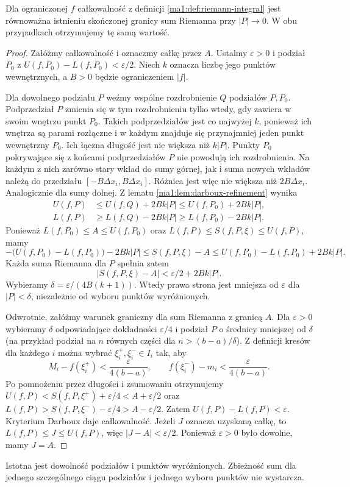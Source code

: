 \begin{twierdzenie}
\label{ma1:thm:riemann-darboux-equivalence}
Dla ograniczonej $f$ całkowalność z definicji \ref{ma1:def:riemann-integral} jest równoważna istnieniu skończonej granicy sum Riemanna przy $|P|\to0$. W obu przypadkach otrzymujemy tę samą wartość.
\end{twierdzenie}
\begin{proof}
Załóżmy całkowalność i oznaczmy całkę przez $A$. Ustalmy $\varepsilon>0$ i podział $P_0$ z $U(f,P_0)-L(f,P_0)<\varepsilon/2$. Niech $k$ oznacza liczbę jego punktów wewnętrznych, a $B>0$ będzie ograniczeniem $|f|$.

Dla dowolnego podziału $P$ weźmy wspólne rozdrobnienie $Q$ podziałów $P,P_0$. Podprzedział $P$ zmienia się w tym rozdrobnieniu tylko wtedy, gdy zawiera w swoim wnętrzu punkt $P_0$. Takich podprzedziałów jest co najwyżej $k$, ponieważ ich wnętrza są parami rozłączne i w każdym znajduje się przynajmniej jeden punkt wewnętrzny $P_0$. Ich łączna długość jest nie większa niż $k|P|$. Punkty $P_0$ pokrywające się z końcami podprzedziałów $P$ nie powodują ich rozdrobnienia. Na każdym z nich zarówno stary wkład do sumy górnej, jak i suma nowych wkładów należą do przedziału $[-B\Delta x_i,B\Delta x_i]$. Różnica jest więc nie większa niż $2B\Delta x_i$. Analogicznie dla sumy dolnej. Z lematu \ref{ma1:lem:darboux-refinement} wynika
\[
 \begin{split}
 U(f,P)&\le U(f,Q)+2Bk|P|\le U(f,P_0)+2Bk|P|,\\
 L(f,P)&\ge L(f,Q)-2Bk|P|\ge L(f,P_0)-2Bk|P|.
 \end{split}
\]
Ponieważ $L(f,P_0)\le A\le U(f,P_0)$ oraz $L(f,P)\le S(f,P,\xi)\le U(f,P)$, mamy
\[
 -\bigl(U(f,P_0)-L(f,P_0)\bigr)-2Bk|P|
 \le S(f,P,\xi)-A
 \le U(f,P_0)-L(f,P_0)+2Bk|P|.
\]
Każda suma Riemanna dla $P$ spełnia zatem
\[
 |S(f,P,\xi)-A|<\varepsilon/2+2Bk|P|.
\]
Wybieramy $\delta=\varepsilon/(4B(k+1))$. Wtedy prawa strona jest mniejsza od $\varepsilon$ dla $|P|<\delta$, niezależnie od wyboru punktów wyróżnionych.

Odwrotnie, załóżmy warunek graniczny dla sum Riemanna z granicą $A$. Dla $\varepsilon>0$ wybieramy $\delta$ odpowiadające dokładności $\varepsilon/4$ i podział $P$ o średnicy mniejszej od $\delta$ (na przykład podział na $n$ równych części dla $n>(b-a)/\delta$). Z definicji kresów dla każdego $i$ można wybrać $\xi_i^+,\xi_i^-\in I_i$ tak, aby
\[
 M_i-f(\xi_i^+)<\frac{\varepsilon}{4(b-a)},\qquad
 f(\xi_i^-)-m_i<\frac{\varepsilon}{4(b-a)}.
\]
Po pomnożeniu przez długości i zsumowaniu otrzymujemy
$U(f,P)<S(f,P,\xi^+)+\varepsilon/4<A+\varepsilon/2$
oraz $L(f,P)>S(f,P,\xi^-)-\varepsilon/4>A-\varepsilon/2$.
Zatem $U(f,P)-L(f,P)<\varepsilon$. Kryterium Darboux daje całkowalność. Jeżeli $J$ oznacza uzyskaną całkę, to $L(f,P)\le J\le U(f,P)$, więc $|J-A|<\varepsilon/2$. Ponieważ $\varepsilon>0$ było dowolne, mamy $J=A$.
\end{proof}
Istotna jest dowolność podziałów i punktów wyróżnionych. Zbieżność sum dla jednego szczególnego ciągu podziałów i jednego wyboru punktów nie wystarcza.

